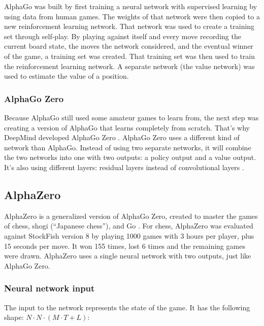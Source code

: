 \documentclass{article}
\begin{document}
AlphaGo was built \cite{AlphaGo, MasteringGameGo}  by first training a neural network with supervised learning by using data from human games.
The weights of that network were then copied to a new reinforcement learning network. That network was used to 
create a training set through self-play. By playing against itself and every move recording the current board state, the 
moves the network considered, and the eventual winner of the game, a training set was created.
That training set was then used to train the reinforcement learning network. A separate network (the value network) 
was used to estimate the value of a position. 

\subsubsection{AlphaGo Zero}

Because AlphaGo still used some amateur games to learn from, the next step was creating a version of AlphaGo
that learns completely from scratch. That's why DeepMind developed AlphaGo Zero \cite{AlphaGoZero2022}.
AlphaGo Zero uses a different kind of network than AlphaGo. Instead of using two separate networks, 
it will combine the two networks into one with two outputs: a policy output and a value output.
It's also using different layers: residual layers instead of convolutional layers \cite{MasteringGameZero}. 

\subsection{AlphaZero}

AlphaZero is a generalized version of AlphaGo Zero, created to master the games of chess, shogi (``Japanese chess''), and Go \cite{AlphaZero2022, silverMasteringChessShogi2017a}. 
For chess, AlphaZero was evaluated against StockFish version 8 by playing 1000 games with 3 hours per player, plus 
15 seconds per move. It won 155 times, lost 6 times and the remaining games were drawn. 
AlphaZero uses a single neural network with two outputs, just like AlphaGo Zero. 


\subsubsection{Neural network input}

The input to the network represents the state of the game. 
It has the following shape: $N \cdot N \cdot (M \cdot T + L)$:
\end{document}
